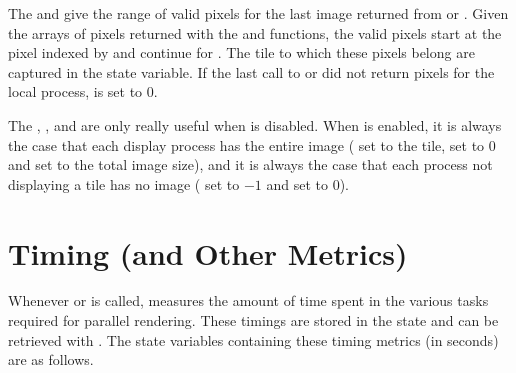 The  and
 give the range of valid pixels for the
last image returned from  or .
Given the arrays of pixels returned with the  and
 functions, the valid pixels start at the pixel
indexed by  and continue for
.  The tile to which these pixels belong
are captured in the  state variable.  If
the last call to  or  did not
return pixels for the local process,  is
set to $0$.

The , ,
and  are only really useful when
 is disabled.  When
 is enabled, it is always the case that each
display process has the entire image ( set
to the tile,  set to $0$ and
 set to the total image size), and it is
always the case that each process not displaying a tile has no image
( set to $-1$ and
 set to $0$).


\section{Timing (and Other Metrics)}
\label{sec:Customizing_Compositing:Timing}

Whenever  or  is called, \IceT
measures the amount of time spent in the various tasks required for
parallel rendering.  These timings are stored in the \IceT state and can be
retrieved with .  The state variables containing these
timing metrics (in seconds) are as follows.

